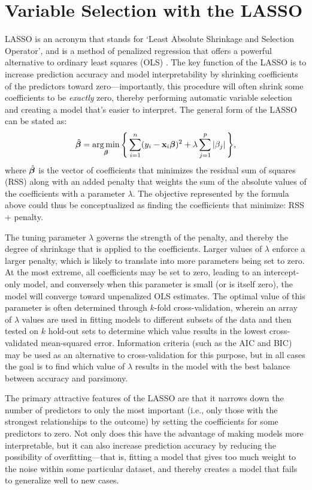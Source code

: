 \section{Variable Selection with the LASSO}
LASSO is an acronym that stands for `Least Absolute Shrinkage and Selection Operator', and is a method of penalized regression that offers a powerful alternative to ordinary least squares (OLS) \cite{tibshirani1996regression}. The key function of the LASSO is to increase prediction accuracy and model interpretability by shrinking coefficients of the predictors toward zero---importantly, this procedure will often shrink some coefficients to be \textit{exactly} zero, thereby performing automatic variable selection and creating a model that's easier to interpret. The general form of the LASSO can be stated as:
\begin{equation}
    \hat{\bm{\beta}} = \operatorname*{arg\,min}_{\bm{\beta}} \operatorname{\Bigg\{} \sum_{i=1}^n (y_i - \mathbf{x}_i \bm{\beta})^2 + \lambda\sum_{j=1}^p |\beta_j| \operatorname{\Bigg\}},
\end{equation}
where $\hat{\bm{\beta}}$ is the vector of coefficients that minimizes the residual sum of squares (RSS) along with an added penalty that weights the sum of the absolute values of the coefficients with a parameter $\lambda$. The objective represented by the formula above could thus be conceptualized as finding the coefficients that minimize: RSS + penalty.

The tuning parameter $\lambda$ governs the strength of the penalty, and thereby the degree of shrinkage that is applied to the coefficients. Larger values of $\lambda$ enforce a larger penalty, which is likely to translate into more parameters being set to zero. At the most extreme, all coefficients may be set to zero, leading to an intercept-only model, and conversely when this parameter is small (or is itself zero), the model will converge toward unpenalized OLS estimates. The optimal value of this parameter is often determined through $k$-fold cross-validation, wherein an array of $\lambda$ values are used in fitting models to different subsets of the data and then tested on $k$ hold-out sets to determine which value results in the lowest cross-validated mean-squared error. Information criteria (such as the AIC and BIC) may be used as an alternative to cross-validation for this purpose, but in all cases the goal is to find which value of $\lambda$ results in the model with the best balance between accuracy and parsimony. 

The primary attractive features of the LASSO are that it narrows down the number of predictors to only the most important (i.e., only those with the strongest relationships to the outcome) by setting the coefficients for some predictors to zero. Not only does this have the advantage of making models more interpretable, but it can also increase prediction accuracy by reducing the possibility of overfitting---that is, fitting a model that gives too much weight to the noise within some particular dataset, and thereby creates a model that fails to generalize well to new cases. 

